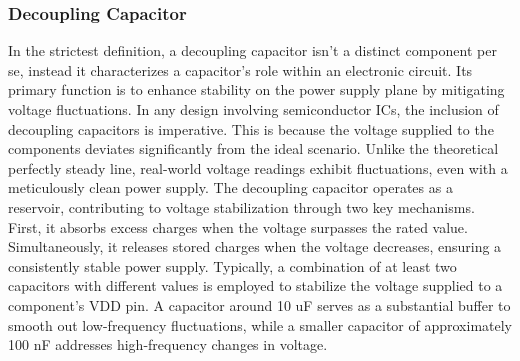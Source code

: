 \documentclass[../report.tex]{subfiles}
\begin{document}
  \subsubsection*{Decoupling Capacitor}
  In the strictest definition, a decoupling capacitor isn't a distinct component per se, instead it characterizes a capacitor's role within an electronic circuit. 
  Its primary function is to enhance stability on the power supply plane by mitigating voltage fluctuations. In any design involving semiconductor ICs, the inclusion of decoupling capacitors is imperative. This is because the voltage supplied to the components deviates significantly from the ideal scenario. Unlike the theoretical perfectly steady line, real-world voltage readings exhibit fluctuations, even with a meticulously clean power supply.
  The decoupling capacitor operates as a reservoir, contributing to voltage stabilization through two key mechanisms. First, it absorbs excess charges when the voltage surpasses the rated value. Simultaneously, it releases stored charges when the voltage decreases, ensuring a consistently stable power supply.
  Typically, a combination of at least two capacitors with different values is employed to stabilize the voltage supplied to a component's VDD pin. A capacitor around 10 uF serves as a substantial buffer to smooth out low-frequency fluctuations, while a smaller capacitor of approximately 100 nF addresses high-frequency changes in voltage. 
\end{document}
